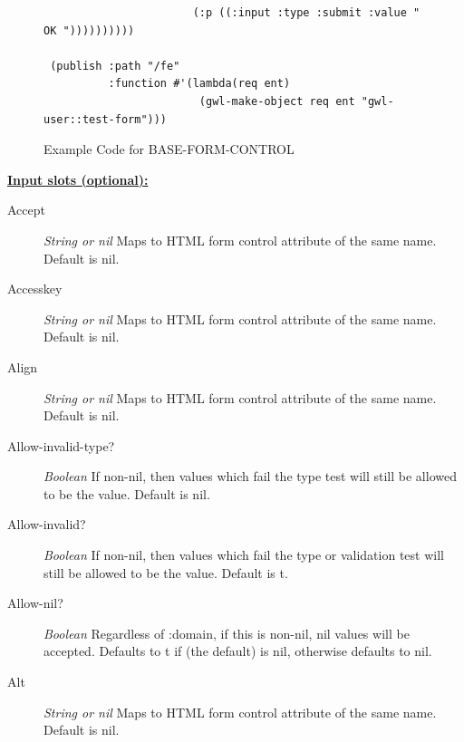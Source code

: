 \documentclass [11pt]{book}
\begin{document}
\begin{itemize}
\begin{figure}
\begin{lrbox}{\boxedverb}
\begin{minipage}{\linewidth}
{\begin{verbatim}
                       (:p ((:input :type :submit :value " OK "))))))))))
 
 (publish :path "/fe"
          :function #'(lambda(req ent)
                        (gwl-make-object req ent "gwl-user::test-form")))

\end{verbatim}}
\end{minipage}
\end{lrbox}
\fbox{\usebox{\boxedverb}}

\caption{Example Code for BASE-FORM-CONTROL}

\label{fig:example-code-BASE-FORM-CONTROL}

\end{figure}





\textbf{
\underline{Input slots (optional):}}

\begin{description}

\item [Accept]
\emph{String or nil} Maps to HTML form control attribute of the same name. Default is nil.


\item [Accesskey]
\emph{String or nil} Maps to HTML form control attribute of the same name. Default is nil.


\item [Align]
\emph{String or nil} Maps to HTML form control attribute of the same name. Default is nil.


\item [Allow-invalid-type?]
\emph{Boolean} If non-nil, then values which fail the type test will still be allowed to be the value. Default is nil.


\item [Allow-invalid?]
\emph{Boolean} If non-nil, then values which fail the type or validation test will still be allowed to be the value. Default is t.


\item [Allow-nil?]
\emph{Boolean} Regardless of :domain, if this is non-nil, nil values will be accepted. Defaults to t if (the default) is nil,
otherwise defaults to nil.


\item [Alt]
\emph{String or nil} Maps to HTML form control attribute of the same name. Default is nil.



\end{description}
\end{itemize}
\end{document}
